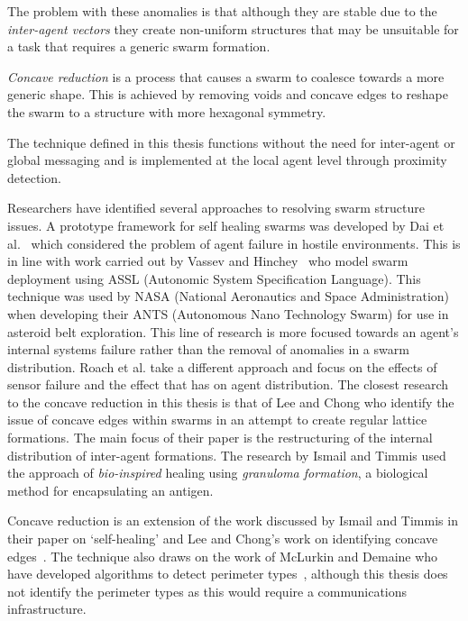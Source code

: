 The problem with these anomalies is that although they are stable due to the \textit{inter-agent vectors} they create non-uniform structures that may be unsuitable for a task that requires a generic swarm formation.

\textit{Concave reduction} is a process that causes a swarm to coalesce towards a more generic shape. This is achieved by removing voids and concave edges to reshape the swarm to a structure with more hexagonal symmetry.  

The technique defined in this thesis functions without the need for inter-agent or global messaging and is implemented at the local agent level through proximity detection.

Researchers have identified several approaches to resolving swarm structure issues. A prototype framework for self healing swarms was developed by Dai et al.~\cite{DHMRZ:06} which considered the problem of agent failure in hostile environments. This is in line with work carried out by Vassev and Hinchey~\cite{VH:09} who model swarm deployment using ASSL (Autonomic System Specification Language). This technique was used by NASA (National Aeronautics and Space Administration) when developing their ANTS (Autonomous Nano Technology Swarm) for use in asteroid belt exploration. This line of research is more focused towards an agent's internal systems failure rather than the removal of anomalies in a swarm distribution. Roach et al. \cite{RMT:15} take a different approach and focus on the effects of sensor failure and the effect that has on agent distribution. The closest research to the concave reduction in this thesis is that of Lee and Chong \cite{GN:08} who identify the issue of concave edges within swarms in an attempt to create regular lattice formations. The main focus of their paper is the restructuring of the internal distribution of inter-agent formations. The research by Ismail and Timmis \cite{IT:10} used the approach of \textit{bio-inspired} healing using \textit{granuloma formation}, a biological method for encapsulating an antigen.

Concave reduction is an extension of the work discussed by Ismail and Timmis in their paper on `self-healing' \cite{IT:10} and Lee and Chong's work on identifying concave edges~\cite{GN:08}. The technique also draws on the work of McLurkin and Demaine who have developed algorithms to detect perimeter types~\cite{MD:09}, although this thesis does not identify the perimeter types as this would require a communications infrastructure.
 
